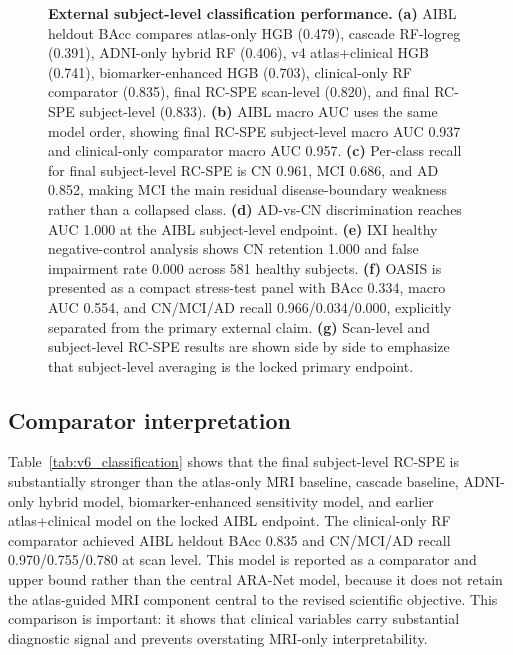 \documentclass[12pt,a4paper]{article}
\begin{document}
\begin{figure}[p]
    \centering
    \caption{\textbf{External subject-level classification performance.} \textbf{(a)} AIBL heldout BAcc compares atlas-only HGB (0.479), cascade RF-logreg (0.391), ADNI-only hybrid RF (0.406), v4 atlas+clinical HGB (0.741), biomarker-enhanced HGB (0.703), clinical-only RF comparator (0.835), final RC-SPE scan-level (0.820), and final RC-SPE subject-level (0.833). \textbf{(b)} AIBL macro AUC uses the same model order, showing final RC-SPE subject-level macro AUC 0.937 and clinical-only comparator macro AUC 0.957. \textbf{(c)} Per-class recall for final subject-level RC-SPE is CN 0.961, MCI 0.686, and AD 0.852, making MCI the main residual disease-boundary weakness rather than a collapsed class. \textbf{(d)} AD-vs-CN discrimination reaches AUC 1.000 at the AIBL subject-level endpoint. \textbf{(e)} IXI healthy negative-control analysis shows CN retention 1.000 and false impairment rate 0.000 across 581 healthy subjects. \textbf{(f)} OASIS is presented as a compact stress-test panel with BAcc 0.334, macro AUC 0.554, and CN/MCI/AD recall 0.966/0.034/0.000, explicitly separated from the primary external claim. \textbf{(g)} Scan-level and subject-level RC-SPE results are shown side by side to emphasize that subject-level averaging is the locked primary endpoint.}
    \label{fig:v6_external_performance}
\end{figure}

\subsection{Comparator interpretation}
\label{sec:comparators}

Table~\ref{tab:v6_classification} shows that the final subject-level RC-SPE is substantially stronger than the atlas-only MRI baseline, cascade baseline, ADNI-only hybrid model, biomarker-enhanced sensitivity model, and earlier atlas+clinical model on the locked AIBL endpoint. The clinical-only RF comparator achieved AIBL heldout BAcc 0.835 and CN/MCI/AD recall 0.970/0.755/0.780 at scan level. This model is reported as a comparator and upper bound rather than the central ARA-Net model, because it does not retain the atlas-guided MRI component central to the revised scientific objective. This comparison is important: it shows that clinical variables carry substantial diagnostic signal and prevents overstating MRI-only interpretability.
\end{document}
